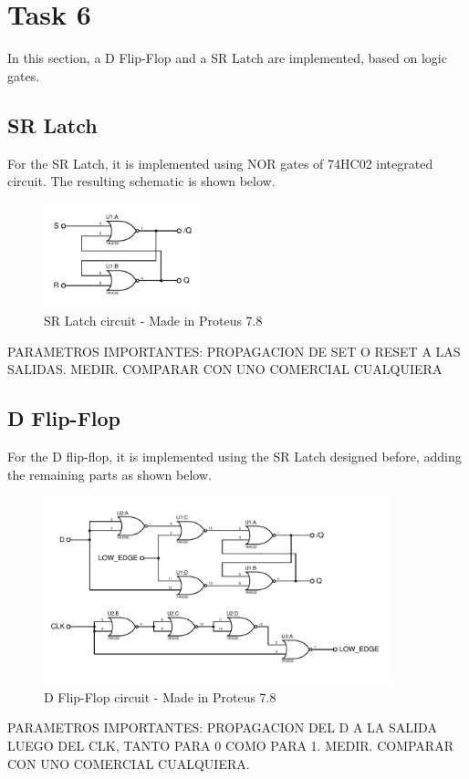 


\section*{Task 6}
In this section, a D Flip-Flop and a SR Latch
are implemented, based on logic gates.
\subsection*{SR Latch}
For the SR Latch, it is 
implemented using NOR gates of 74HC02 integrated
circuit. The resulting schematic is shown below.

\begin{figure}[H]
    \begin{centering}
    \includegraphics[width=0.4\textwidth]{latchSR}
    \par\end{centering}
    \caption{SR Latch circuit - Made in Proteus 7.8}
\end{figure}

PARAMETROS IMPORTANTES: PROPAGACION DE SET O 
RESET A LAS SALIDAS. MEDIR. COMPARAR CON UNO
COMERCIAL CUALQUIERA

\subsection*{D Flip-Flop}
For the D flip-flop, it is implemented using 
the SR Latch designed before, adding the 
remaining parts as shown below.

\begin{figure}[H]
    \begin{centering}
    \includegraphics[width=0.9\textwidth]{dflipflop}
    \par\end{centering}
    \caption{D Flip-Flop circuit - Made in Proteus 7.8}
\end{figure}

PARAMETROS IMPORTANTES: PROPAGACION DEL D A
LA SALIDA LUEGO DEL CLK, TANTO PARA 0 COMO
PARA 1. MEDIR. COMPARAR CON UNO COMERCIAL
CUALQUIERA.


